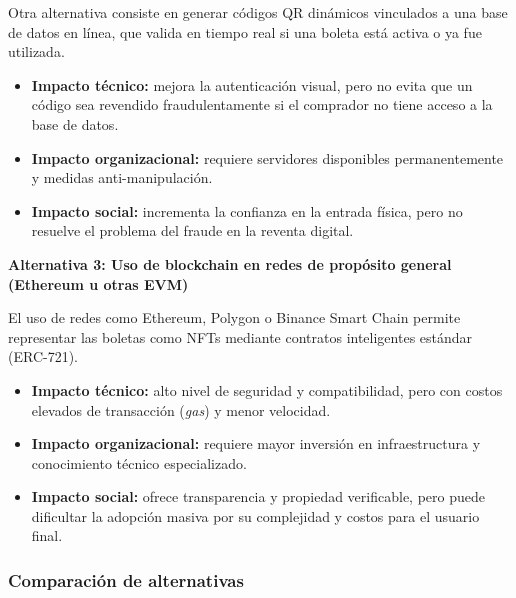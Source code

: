 \documentclass[12pt,a4paper]{article}
\begin{document}
Otra alternativa consiste en generar códigos QR dinámicos vinculados a una base
de datos en línea, que valida en tiempo real si una boleta está activa o ya fue
utilizada.

\begin{itemize}
    \item \textbf{Impacto técnico:} mejora la autenticación visual, pero no evita
    que un código sea revendido fraudulentamente si el comprador no tiene acceso
    a la base de datos.
    \item \textbf{Impacto organizacional:} requiere servidores disponibles
    permanentemente y medidas anti-manipulación.
    \item \textbf{Impacto social:} incrementa la confianza en la entrada física,
    pero no resuelve el problema del fraude en la reventa digital.
\end{itemize}

\textbf{Alternativa 3: Uso de blockchain en redes de propósito general (Ethereum u otras EVM)}

El uso de redes como Ethereum, Polygon o Binance Smart Chain permite representar
las boletas como NFTs mediante contratos inteligentes estándar (ERC-721).

\begin{itemize}
    \item \textbf{Impacto técnico:} alto nivel de seguridad y compatibilidad, pero
    con costos elevados de transacción (\textit{gas}) y menor velocidad.
    \item \textbf{Impacto organizacional:} requiere mayor inversión en
    infraestructura y conocimiento técnico especializado.
    \item \textbf{Impacto social:} ofrece transparencia y propiedad verificable,
    pero puede dificultar la adopción masiva por su complejidad y costos para el
    usuario final.
\end{itemize}

\subsubsection{Comparación de alternativas}
\end{document}
